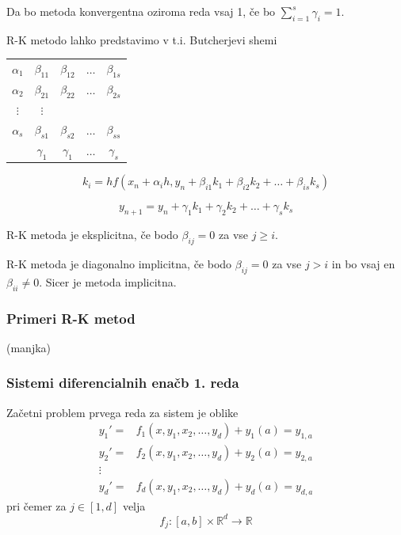 \documentclass[a4paper,12pt]{article}
\theoremstyle{definition}
\theoremstyle{remark}
\newcommand{\R}{\mathbb{R}}
\newcounter{subsubsubsection}[subsubsection]
\begin{document}
Da bo metoda konvergentna oziroma reda vsaj 1, če bo $\sum_{i=1}^{s} \gamma_i = 1$.

R-K metodo lahko predstavimo v t.i. Butcherjevi shemi

\begin{center}
    \begin{tabular}{ c|c c c c }
        $\alpha_1$ & $\beta_{11}$ & $\beta_{12}$ & $\dots$ & $\beta_{1s}$ \\
        $\alpha_2$ & $\beta_{21}$ & $\beta_{22}$ & $\dots$ & $\beta_{2s}$ \\
        $\vdots$ & $\vdots$ \\
        $\alpha_s$ & $\beta_{s1}$ & $\beta_{s2}$ & $\dots$ & $\beta_{ss}$ \\
        \hline
        & $\gamma_1$ & $\gamma_1$ & $\dots$ & $\gamma_s$
    \end{tabular}
\end{center}


\begin{equation*}
    k_i = h f(x_n + \alpha_i h, y_n + \beta_{i1}k_1 + \beta_{i2}k_2 + \dots + \beta_{is}k_s)
\end{equation*}

\begin{equation*}
    y_{n+1} = y_n + \gamma_1 k_1 + \gamma_2 k_2 + \dots + \gamma_s k_s
\end{equation*}

R-K metoda je eksplicitna, če bodo $\beta_{ij} = 0$ za vse $j \geq i$.

R-K metoda je diagonalno implicitna, če bodo $\beta_{ij} = 0$ za vse $j > i$ in bo vsaj en $\beta_{ii} \neq 0$. Sicer je metoda implicitna.

\subsubsection{Primeri R-K metod}
(manjka)
%


\subsubsection{Sistemi diferencialnih enačb 1. reda}
Začetni problem prvega reda za sistem je oblike
\begin{align*}
    y_1' =& f_1(x, y_1, x_2, \dots, y_d) + y_1(a) = y_{1, a} \\
    y_2' =& f_2(x, y_1, x_2, \dots, y_d) + y_2(a) = y_{2, a} \\
    \vdots& \\
    y_d' =& f_d(x, y_1, x_2, \dots, y_d) + y_d(a) = y_{d, a}
\end{align*}
pri čemer za $j \in [1, d]$ velja
\begin{equation*}
    f_j: [a, b] \times \R^d \to \R
\end{equation*}
\end{document}
